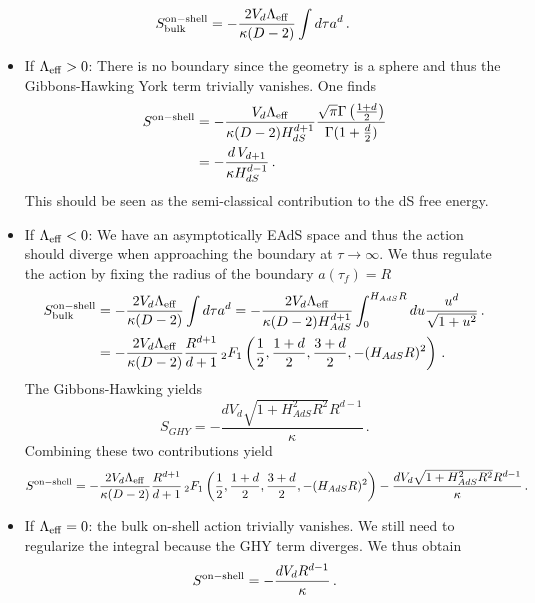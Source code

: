 \documentclass[a4paper]{article}
\begin{document}
\begin{equation}\label{eq:bulkonshelltrivial}
  S^{\rm on-shell}_{\rm bulk} =-\frac{2V_d\Lambda_{\rm eff}}{\kappa(D-2)}\int d\tau a^d\,.
\end{equation}
\begin{itemize}
  \item If $\Lambda_{\rm eff}>0$: There is no boundary since the geometry is a sphere and thus the Gibbons-Hawking York term trivially vanishes. One finds
  \begin{equation}
    \begin{aligned}
      S^{\rm on-shell} &= -\frac{V_d\Lambda_{\rm eff}}{\kappa(D-2)H_{dS}^{d+1}}\frac{\sqrt{\pi}\Gamma\left(\frac{1+d}{2}\right)}{\Gamma(1+\frac{d}{2})}\\
      &= -\frac{d\,V_{d+1}}{\kappa H_{dS}^{d-1}}\,.
    \end{aligned}
  \end{equation}
  This should be seen as the semi-classical contribution to the dS free energy.
  \item If $\Lambda_{\rm eff}<0$: We have an asymptotically EAdS space and thus the action should diverge when approaching the boundary at $\tau \to \infty$. We thus regulate the action by fixing the radius of the boundary $a(\tau_f)=R$
  \begin{equation}
  \begin{aligned}
    S^{\rm on-shell}_{\rm bulk} &=-\frac{2V_d\Lambda_{\rm eff}}{\kappa(D-2)}\int d\tau a^d = -\frac{2V_d\Lambda_{\rm eff}}{\kappa(D-2)H_{AdS}^{d+1}} \int_0^{H_{AdS}R}du \frac{u^{d}}{\sqrt{1+u^2}}\,.\\
    &=-\frac{2V_d\Lambda_{\rm eff}}{\kappa(D-2)} \frac{R^{d+1}}{d+1}\,{}_2F_1\left(\frac{1}{2},\frac{1+d}{2},\frac{3+d}{2},-(H_{AdS}R)^2\right)\,.
  \end{aligned}
  \end{equation}
  The Gibbons-Hawking yields
  \begin{equation}
    S_{GHY}=-\frac{dV_{d}\sqrt{1+H_{AdS}^2 R^2}R^{d-1}}{\kappa}\,.
  \end{equation}
  Combining these two contributions yield
  \begin{equation}
    S^{\rm on-shell} = -\frac{2V_d\Lambda_{\rm eff}}{\kappa(D-2)} \frac{R^{d+1}}{d+1}\,{}_2F_1\left(\frac{1}{2},\frac{1+d}{2},\frac{3+d}{2},-(H_{AdS}R)^2\right)-\frac{dV_{d}\sqrt{1+H_{AdS}^2 R^2}R^{d-1}}{\kappa}\,.
  \end{equation}
  \item If $\Lambda_{\rm eff}=0$: the bulk on-shell action trivially vanishes. We still need to regularize the integral because the GHY term diverges. We thus obtain
  \begin{equation}
    S^{\rm on-shell} = -\frac{dV_{d}R^{d-1}}{\kappa}\,.
  \end{equation}
\end{itemize}
\end{document}
